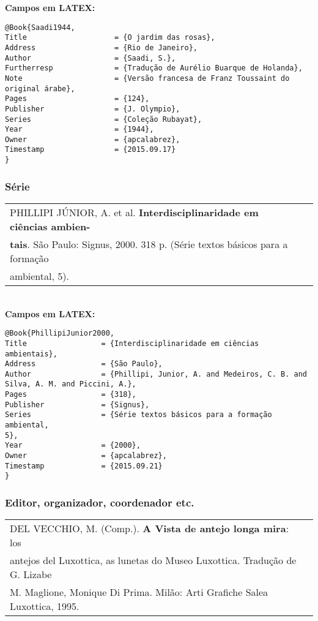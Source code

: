 \textbf{Campos em LATEX:}

\begin{verbatim}
@Book{Saadi1944,
Title                    = {O jardim das rosas},
Address                  = {Rio de Janeiro},
Author                   = {Saadi, S.},
Furtherresp              = {Tradução de Aurélio Buarque de Holanda},
Note                     = {Versão francesa de Franz Toussaint do 
original árabe},
Pages                    = {124},
Publisher                = {J. Olympio},
Series                   = {Coleção Rubayat},
Year                     = {1944},
Owner                    = {apcalabrez},
Timestamp                = {2015.09.17}
}
\end{verbatim}

\subsubsection{Série}

\begin{tabular}{|l|c|} \hline
PHILLIPI JÚNIOR, A. et al. \textbf{Interdisciplinaridade em ciências ambien-}\\ 
\textbf{tais}. São Paulo: Signus, 2000. 318 p. (Série textos básicos para a formação \\ambiental, 5). \\\hline
\end{tabular}\\

\textbf{Campos em LATEX:}

\begin{verbatim}
@Book{PhillipiJunior2000,
Title                 = {Interdisciplinaridade em ciências ambientais},
Address               = {São Paulo},
Author                = {Phillipi, Junior, A. and Medeiros, C. B. and 
Silva, A. M. and Piccini, A.},
Pages                 = {318},
Publisher             = {Signus},
Series                = {Série textos básicos para a formação ambiental, 
5},
Year                  = {2000},
Owner                 = {apcalabrez},
Timestamp             = {2015.09.21}
}
\end{verbatim}

\subsubsection{Editor, organizador, coordenador etc.}

\begin{tabular}{|l|c|} \hline
DEL VECCHIO, M. (Comp.). \textbf{A Vista de antejo longa mira}: los \\antejos
del  Luxottica, as lunetas do Museo Luxottica. Tradução de G. Lizabe \\M. Maglione,  Monique Di Prima. Milão: Arti Grafiche Salea Luxottica, 1995.  \\\hline
\end{tabular}\\

